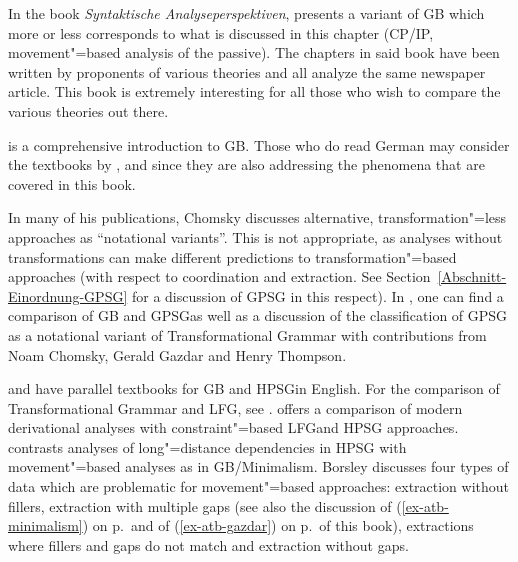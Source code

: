 In the book \emph{Syntaktische Analyseperspektiven}, \citet{Lohnstein2014a} presents a variant of GB
which more or less corresponds to what is discussed
in this chapter (CP/IP, movement"=based analysis of the passive). The chapters in said book have been written by proponents of various theories
and all analyze the same newspaper article. This book is extremely interesting for all those who wish to compare the various theories out there.

 is a comprehensive introduction to GB. Those who do read German may consider
the textbooks by ,  and  since they are also
addressing the phenomena that are covered in this book.

In many of his publications, Chomsky discusses alternative, transformation"=less approaches as ``notational variants''.
This is not appropriate, as analyses without transformations can make different predictions to
transformation"=based approaches (\eg with respect to coordination
and extraction. See Section~\ref{Abschnitt-Einordnung-GPSG} for a discussion of GPSG in this respect). In , one can find a comparison
of GB and GPSG\indexgpsg as well as a discussion of the classification of GPSG as a notational variant of Transformational Grammar with contributions
from Noam Chomsky, Gerald Gazdar and Henry Thompson.


\citet{Borsley99a-u} and \citet{KS2008a-u} have parallel textbooks for GB and HPSG\indexhpsg in English. For the comparison of Transformational Grammar
and LFG, see .  offers a comparison of modern derivational analyses with constraint"=based LFG\indexlfg and HPSG approaches.
\citet{Borsley2012a} contrasts analyses of long"=distance dependencies in HPSG with movement"=based analyses as in GB/Minimalism. Borsley discusses
four types of data which are problematic for movement"=based approaches: extraction without fillers,
extraction with multiple gaps (see also the discussion of (\ref{ex-atb-minimalism}) on
p.\,\pageref{ex-atb-minimalism} and of (\ref{ex-atb-gazdar}) on p.\,\pageref{ex-atb-gazdar} of this
book), extractions where fillers and gaps do not match and extraction without gaps.
















